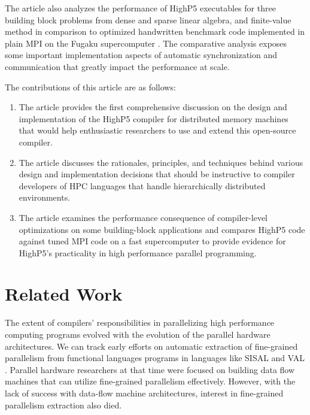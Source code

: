 \documentclass[ASNA,twocolumn]{USG} %
\begin{document}
{The article also analyzes the performance of HighP5 executables for three building block problems from dense and sparse linear algebra, and finite-value method in comparison to optimized handwritten benchmark code implemented in plain MPI on the Fugaku supercomputer \citep{sato2021co}. The comparative analysis exposes some important implementation aspects of automatic synchronization and communication that greatly impact the performance at scale.
	
{\color{red}
The contributions of this article are as follows:
\begin{enumerate}
	\item The article provides the first comprehensive discussion on the design and implementation of the HighP5 compiler for distributed memory machines that would help enthusiastic researchers to use and extend this open-source compiler.
	\item The article discusses the rationales, principles, and techniques behind various design and implementation decisions that should be instructive to compiler developers of HPC languages that handle hierarchically distributed environments.
	\item The article examines the performance consequence of compiler-level optimizations on some building-block applications and compares HighP5 code against tuned MPI code on a fast supercomputer to provide evidence for HighP5's practicality in high performance parallel programming.     
\end{enumerate}
}
	
\section{Related Work}
\label{sec:related-work}
The extent of compilers' responsibilities in parallelizing high performance computing programs evolved with the evolution of the parallel hardware architectures. We can track early efforts on automatic extraction of fine-grained parallelism from functional languages programs in languages like SISAL \citep{osti_10192282}\citep{FEO1990349} and VAL \citep{10.1145/357153.357157}. Parallel hardware researchers at that time were focused on building data flow machines \citep{GURD198549}\citep{10.1145/27633.28055} that can utilize fine-grained parallelism effectively. However, with the lack of success with data-flow machine architectures, interest in fine-grained parallelism extraction also died.
	
}
\end{document}
